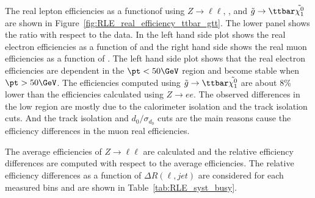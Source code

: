 The real lepton efficiencies as a functionof \pt using $Z\to\ell\ell$, \ttbar, and $\tilde{g}\to\ttbar\tilde{\chi^{0}_{1}}$ are shown in Figure~\ref{fig:RLE_real_efficiency_ttbar_gtt}.
The lower panel shows the ratio with respect to the data.
In the left hand side plot shows the real electron efficiencies as a function of \pt and the right hand side shows the real muon efficiencies as a function of \pt. 
The left hand side plot shows that the real electron efficiencies are \pt dependent in the $\pt<50 \GeV$ region and become stable when $\pt>50 \GeV$.
The efficiencies computed using $\tilde{g}\to\ttbar\tilde{\chi^{0}_{1}}$ are about 8\% lower than the efficiencies calculated using $Z\to ee$.
The observed differences in the low \pt region are mostly due to the calorimeter isolation and the track isolation cuts.
And the track isolation and $d_{0}/\sigma_{d_{0}}$ cuts are the main reasons cause the efficiency differences in the muon real efficiencies.

The average efficiencies of $Z\to\ell\ell$ are calculated and the relative efficiency differences are computed with respect to the average efficiencies.
The relative efficiency differences as a function of $\Delta R(\ell, jet)$ are considered for each measured \pt bins and are shown in Table~\ref{tab:RLE_syst_busy}.

